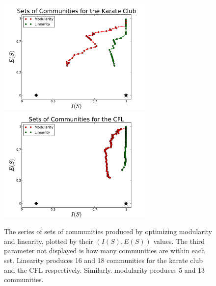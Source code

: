 \documentclass[conference]{IEEEtran}
\begin{document}
\begin{figure}[!h]
\centering
\includegraphics[width=3in]{Figures/Karate_Club_ml}
\includegraphics[width=3in]{Figures/CFL_ml}
\caption{The series of sets of communities produced by optimizing modularity and linearity, plotted by their $(I(S), E(S))$ values.  The third parameter not displayed is how many communities are within each set.  Linearity produces 16 and 18 communities for the karate club and the CFL respectively.  Similarly. modularity produces 5 and 13 communities.}
\label{fig_k_cfl}
\end{figure}
\end{document}
